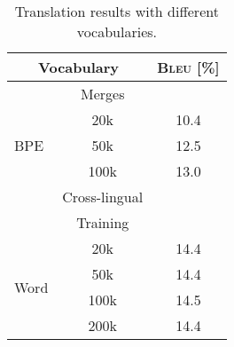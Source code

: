 \documentclass[11pt, a4paper, landscape]{article}
\begin{document}
	
	
	
	\NewPage
	\vfill
	\begin{table}[!ht]
		\centering
		\begin{tabular}{lcc}
			\toprule
			\multicolumn{2}{c}{Vocabulary} & \textsc{Bleu} [\%] \\
			\midrule
			& Merges \\
			\cmidrule{2-2}
			\multirow{3}{*}{BPE} & 20k & 10.4 \\
			& 50k & 12.5 \\
			& 100k & 13.0 \\
			\midrule
			& Cross-lingual \\
			& Training \\
			\cmidrule{2-2}
			\multirow{4}{*}{Word} & 20k & 14.4\\
			& 50k & 14.4\\
			& 100k & 14.5\\
			& 200k & 14.4\\
			\bottomrule
		\end{tabular}
		\caption{Translation results with different vocabularies.}
		\label{tab:vocab}
	\end{table}
	\vfill

	\FinalPage
	

	
	
	\NewPage
	
	
	
\end{document}
